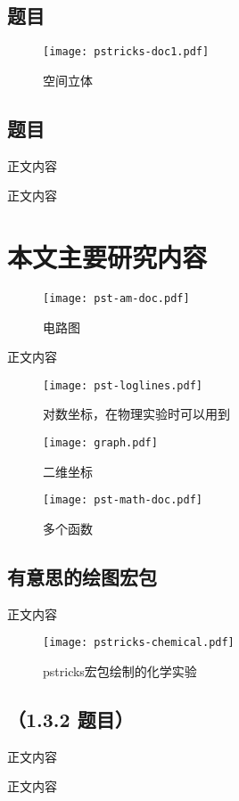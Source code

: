\subsection{题目}
\begin{figure}[htp]
\centering
\texttt{[image: pstricks-doc1.pdf]}
\caption{空间立体}
\end{figure}
\subsection{题目}
正文内容

正文内容

\section{本文主要研究内容}
\begin{figure}[htp]
\centering
\texttt{[image: pst-am-doc.pdf]}
\caption{电路图}
\end{figure}

正文内容
\begin{figure}[htp]
\centering
\texttt{[image: pst-loglines.pdf]}
\caption{对数坐标，在物理实验时可以用到}
\end{figure}

\begin{figure}[htp]
\centering
\texttt{[image: graph.pdf]}
\caption{二维坐标}
\end{figure}
\begin{figure}[htp]
\centering
\texttt{[image: pst-math-doc.pdf]}
\caption{多个函数}
\end{figure}
\subsection{有意思的绘图宏包}
正文内容

\begin{figure}[htp]
\centering
\texttt{[image: pstricks-chemical.pdf]}
\caption{pstricks宏包绘制的化学实验}
\end{figure}

\subsection{（1.3.2 题目）}
正文内容

正文内容


